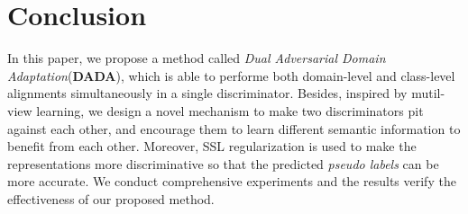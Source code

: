 \documentclass{ecai}
\begin{document}
\section{Conclusion}
In this paper, we propose a method called {\emph{Dual Adversarial Domain Adaptation}}(\textbf{DADA}), which is able to performe both domain-level and class-level alignments simultaneously in a single discriminator.  Besides, inspired by mutil-view learning, we design a  novel mechanism to make  two discriminators pit against each other, and encourage them to learn  different semantic information to benefit from each other.  Moreover, SSL regularization is used to make the representations more discriminative so that the predicted {\emph{pseudo labels}} can be more accurate.  We conduct comprehensive experiments and the results verify the effectiveness of our proposed method.



\end{document}

